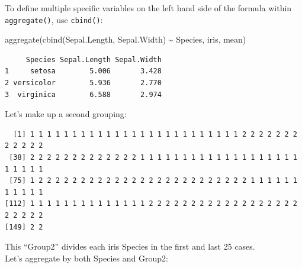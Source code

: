 \documentclass[
]{book}
\newenvironment{Shaded}{\begin{snugshade}}{\end{snugshade}}
\newcommand{\AttributeTok}[1]{\textcolor[rgb]{0.77,0.63,0.00}{#1}}
\newcommand{\DecValTok}[1]{\textcolor[rgb]{0.00,0.00,0.81}{#1}}
\newcommand{\FunctionTok}[1]{\textcolor[rgb]{0.00,0.00,0.00}{#1}}
\newcommand{\NormalTok}[1]{#1}
\newcommand{\OtherTok}[1]{\textcolor[rgb]{0.56,0.35,0.01}{#1}}
\newcommand{\SpecialCharTok}[1]{\textcolor[rgb]{0.00,0.00,0.00}{#1}}
\begin{document}
To define multiple specific variables on the left hand side of the formula within \texttt{aggregate()}, use \texttt{cbind()}:

\begin{Shaded}
\begin{Highlighting}[]
\FunctionTok{aggregate}\NormalTok{(}\FunctionTok{cbind}\NormalTok{(Sepal.Length, Sepal.Width) }\SpecialCharTok{\textasciitilde{}}\NormalTok{ Species, iris, mean)}
\end{Highlighting}
\end{Shaded}

\begin{verbatim}
     Species Sepal.Length Sepal.Width
1     setosa        5.006       3.428
2 versicolor        5.936       2.770
3  virginica        6.588       2.974
\end{verbatim}

Let's make up a second grouping:

\begin{Shaded}
\end{Shaded}

\begin{verbatim}
  [1] 1 1 1 1 1 1 1 1 1 1 1 1 1 1 1 1 1 1 1 1 1 1 1 1 1 2 2 2 2 2 2 2 2 2 2 2 2
 [38] 2 2 2 2 2 2 2 2 2 2 2 2 2 1 1 1 1 1 1 1 1 1 1 1 1 1 1 1 1 1 1 1 1 1 1 1 1
 [75] 1 2 2 2 2 2 2 2 2 2 2 2 2 2 2 2 2 2 2 2 2 2 2 2 2 2 1 1 1 1 1 1 1 1 1 1 1
[112] 1 1 1 1 1 1 1 1 1 1 1 1 1 1 2 2 2 2 2 2 2 2 2 2 2 2 2 2 2 2 2 2 2 2 2 2 2
[149] 2 2
\end{verbatim}

This ``Group2'' divides each iris Species in the first and last 25 cases.\\
Let's aggregate by both Species and Group2:

\begin{Shaded}
\end{Shaded}
\end{document}
